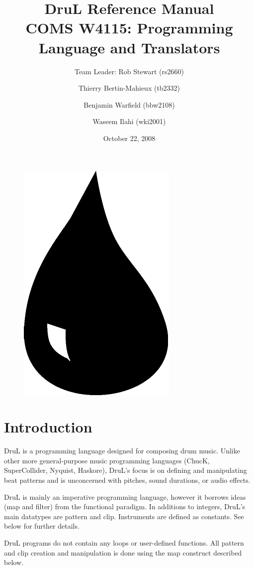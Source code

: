 
\title{\textbf{DruL} Reference Manual\\
\vspace{1cm}
COMS W4115: Programming Language and Translators}
\author{Team Leader: Rob Stewart (rs2660) \and Thierry Bertin-Mahieux (tb2332) \and Benjamin Warfield (bbw2108) \and Waseem Ilahi (wki2001)\\
\date{October 22, 2008}}


\maketitle
\begin{center}
\end{center}

\vspace{3cm}

\begin{figure}[h]
\begin{center}
\includegraphics[width=.2\columnwidth]{Water_Drop.pdf}
\end{center}
\end{figure}

\newpage





\section{Introduction}

DruL is a programming language designed for composing drum music.  Unlike other more general-purpose music programming languages (ChucK, SuperCollider, Nyquist, Haskore), DruL's focus is on defining and manipulating beat patterns and is unconcerned with pitches, sound durations, or audio effects.

DruL is mainly an imperative programming language, however it borrows ideas (map and filter) from the functional paradigm.  In additions to integers, DruL's main datatypes are pattern and clip. Instruments are defined as constants.  See below for further details.

DruL programs do not contain any loops or user-defined functions.  All pattern 
and clip creation and manipulation is done using the map construct described below.





